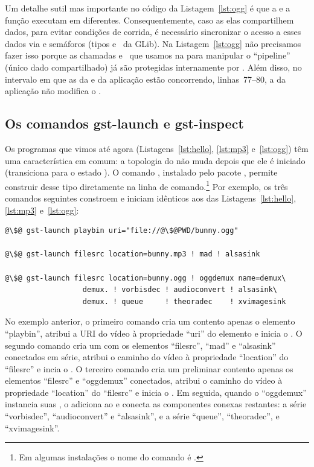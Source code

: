 \documentclass{SBCbookchapter}
\begin{document}
Um detalhe sutil mas importante no código da Listagem~\ref{lst:ogg} é que a
  e a função  executam em 
diferentes.  Consequentemente, caso as elas compartilhem dados, para evitar
condições de corrida, é necessário sincronizar o acesso a esses dados via
 e semáforos (tipos  e~ da GLib).  Na
Listagem~\ref{lst:ogg} não precisamos fazer isso porque as chamadas
 e~ que usamos na  para
manipular o ``pipeline'' (único dado compartilhado) já são protegidas
internamente por .  Além disso, no intervalo em que as
 da  e da aplicação estão concorrendo,
linhas~77--80, a  da aplicação não modifica o .


\subsection*{Os comandos gst-launch e gst-inspect}

Os programas que vimos até agora (Listagens~\ref{lst:hello}, \ref{lst:mp3}
e~\ref{lst:ogg}) têm uma característica em comum: a topologia do
 não muda depois que ele é iniciado (transiciona para o estado
).  O comando , instalado pelo pacote
, permite construir  desse tipo diretamente na
linha de comando.\footnote{Em algumas instalações o nome do comando é
  .}  Por exemplo, os três comandos seguintes constroem e
iniciam  idênticos aos das Listagens~\ref{lst:hello},
\ref{lst:mp3} e~\ref{lst:ogg}:
\begin{lstlisting}[style=command]
@\$@ gst-launch playbin uri="file://@\$@PWD/bunny.ogg"

@\$@ gst-launch filesrc location=bunny.mp3 ! mad ! alsasink

@\$@ gst-launch filesrc location=bunny.ogg ! oggdemux name=demux\
                  demux. ! vorbisdec ! audioconvert ! alsasink\
                  demux. ! queue     ! theoradec    ! xvimagesink
\end{lstlisting}

No exemplo anterior, o primeiro comando cria um  contento
apenas o elemento ``playbin'', atribui a URI do vídeo à propriedade ``uri''
do elemento e inicia o \en{pipeline}.  O segundo comando cria um
 com os elementos ``filesrc'', ``mad'' e ``alsasink''
conectados em série, atribui o caminho do vídeo à propriedade ``location''
do ``filesrc'' e incia o \en{pipeline}.  O terceiro comando cria um
 preliminar contento apenas os elementos ``filesrc'' e
``oggdemux'' conectados, atribui o caminho do vídeo à propriedade
``location'' do ``filesrc'' e inicia o .  Em seguida, quando o
``oggdemux'' instancia suas \en{sometimes pads}, o \en{gst-launch} adiciona
ao \en{pipeline} e conecta as componentes conexas restantes: a série
``vorbisdec'', ``audioconvert'' e ``alsasink'', e a série ``queue'',
``theoradec'', e ``xvimagesink''.
\end{document}
